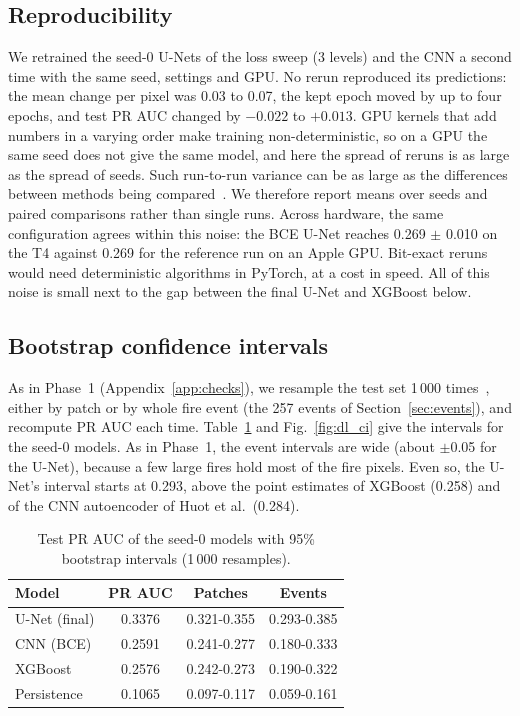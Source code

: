 \subsection{Reproducibility}

We retrained the seed-0 U-Nets of the loss sweep (3 levels) and the CNN a second time with the same seed,
settings and GPU. No rerun
reproduced its predictions: the mean change per pixel was 0.03 to 0.07, the kept epoch moved by up to four
epochs, and test PR AUC changed by $-0.022$ to $+0.013$. GPU kernels that add numbers in a varying order make
training non-deterministic, so on a GPU the same seed does not give the same model, and here the spread of
reruns is as large as the spread of seeds. Such run-to-run variance can be as large as the differences between
methods being compared~\cite{bouthillier2021}. We therefore report means over seeds and paired
comparisons rather than single runs. Across hardware, the same configuration agrees within this noise: the
BCE U-Net reaches 0.269 $\pm$ 0.010 on the T4 against 0.269 for the reference run on an Apple GPU. Bit-exact
reruns would need deterministic algorithms in PyTorch, at a cost in speed. All of this noise is small
next to the gap between the final U-Net and XGBoost below.

\subsection{Bootstrap confidence intervals}

As in Phase~1 (Appendix~\ref{app:checks}), we resample the test set 1\,000 times~\cite{efron1979}, either by
patch or by whole fire event (the 257 events of Section~\ref{sec:events}), and recompute PR AUC each time.
Table~\ref{tab:dl_ci} and Fig.~\ref{fig:dl_ci} give the intervals for the seed-0 models. As in Phase~1, the
event intervals are wide (about $\pm$0.05 for the U-Net), because a few large fires hold most of the fire
pixels. Even so, the U-Net's interval starts at 0.293, above the point estimates of XGBoost (0.258) and of
the CNN autoencoder of Huot et al.\ (0.284).

\begin{table}[t]
\centering
\caption{Test PR AUC of the seed-0 models with 95\% bootstrap intervals (1\,000 resamples).}
\label{tab:dl_ci}
\small
\renewcommand{\arraystretch}{1.12}
\begin{tabular}{lccc}
\toprule
\rowcolor{tblhead}
\textbf{Model} & \textbf{PR AUC} & \textbf{Patches} & \textbf{Events} \\
\midrule
\rowcolor{tblours}
U-Net (final) & 0.3376 & 0.321-0.355 & 0.293-0.385 \\
CNN (BCE) & 0.2591 & 0.241-0.277 & 0.180-0.333 \\
XGBoost & 0.2576 & 0.242-0.273 & 0.190-0.322 \\
Persistence & 0.1065 & 0.097-0.117 & 0.059-0.161 \\
\bottomrule
\end{tabular}
\end{table}

